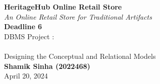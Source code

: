 \begin{titlepage}
    \begin{center}
    
    
    {\fontsize{24}{48}\selectfont \bfseries HeritageHub Online Retail Store}
    \\\vspace{5pt}
    {\fontsize{15}{48}\selectfont \textit{An Online Retail Store for Traditional Artifacts}}
    \\\vspace{40pt}
    {\fontsize{35}{48}\selectfont \bfseries Deadline 6} 
    \\\vspace{20pt}
    {\LARGE DBMS Project : \\
    \\\vspace{10pt}
    Designing the Conceptual and Relational Models} \\
    \vspace{20pt}
    \textbf{{\fontsize{18}{22}\selectfont Shamik Sinha (2022468)}}
        \vspace{8pt}
        \\ {\fontsize{16}{19.2}\selectfont April 20, 2024}
    \end{center}
\end{titlepage}